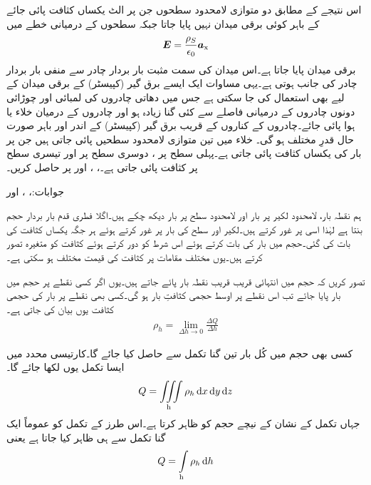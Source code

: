 اس نتیجے کے مطابق دو متوازی لامحدود سطحوں جن پر الٹ یکساں کثافت پائی جائے کے باہر کوئی برقی میدان نہیں پایا جاتا جبکہ سطحوں کے درمیانی خطے میں
\begin{align}\label{مساوات_کولمب_متوازی_چادر_کپیسٹر_کا_میدان}
{\ensuremath{{\boldsymbol{E}}}}=\frac{\rho_S}{\epsilon_0}{\boldsymbol{a}}_{\textup{x}}
\end{align}
برقی میدان پایا جاتا ہے۔اس میدان کی سمت مثبت بار بردار چادر سے منفی بار بردار چادر کی جانب ہوتی ہے۔یہی مساوات ایک ایسے برق گیر (کپیسٹر) کے برقی میدان کے لیے بھی استعمال کی جا سکتی ہے  جس میں دھاتی چادروں  کی لمبائی اور چوڑائی دونوں چادروں کے درمیانی فاصلے سے کئی گنا زیادہ ہو اور چادروں کے درمیان خلاء یا ہوا پائی جائے۔چادروں کے کناروں کے قریب برق گیر (کپیسٹر) کے اندر اور باہر صورت حال قدرِ مختلف ہو گی۔ 
خلاء میں تین متوازی لامحدود سطحیں پائی جاتی ہیں جن پر بار کی یکساں کثافت پائی جاتی ہے۔پہلی سطح  پر  ، دوسری سطح   پر   اور تیسری سطح  پر   کثافت پائی جاتی ہے۔، ، اور  پر  حاصل کریں۔

جوابات:، ،  اور  

ہم نقطہ بار، لامحدود لکیر پر بار اور لامحدود سطح پر بار دیکھ چکے ہیں۔اگلا فطری قدم  بار بردار حجم بنتا ہے لہٰذا اسی پر غور کرتے ہیں۔لکیر اور سطح کی بار  پر غور کرتے ہوئے ہر جگہ یکساں کثافت کی بات کی گئی۔حجم میں بار کی بات کرتے ہوئے اس شرط کو دور کرتے ہوئے کثافت کو متغیرہ تصور کرتے ہیں۔یوں مختلف مقامات پر کثافت کی قیمت مختلف ہو سکتی ہے۔

تصور کریں کہ حجم میں انتہائی قریب قریب نقطہ بار پائے جاتے ہیں۔یوں اگر کسی نقطے پر  حجم میں  بار پایا جائے تب اس نقطے پر اوسط حجمی کثافتِ بار  ہو گی۔کسی بھی نقطے پر بار کی حجمی  کثافت  یوں بیان کی جاتی ہے۔
\begin{align}
\rho_h=\lim_{\Delta h \to 0} \frac{\Delta Q}{\Delta h}
\end{align} 

کسی بھی حجم میں کُل بار   تین گنا تکمل سے حاصل کیا جائے گا۔کارتیسی محدد میں ایسا تکمل یوں لکھا جائے گا۔
\begin{align}
Q=\iiint\limits_{\text{h}} \rho_h \dif x \dif y \dif z
\end{align}
جہاں تکمل کے نشان کے نیچے  حجم کو ظاہر کرتا ہے۔اس طرز کے تکمل کو عموماً ایک گنا تکمل سے ہی ظاہر کیا جاتا ہے یعنی
\begin{align}
Q=\int\limits_{\text{h}} \rho_h \dif h
\end{align}


